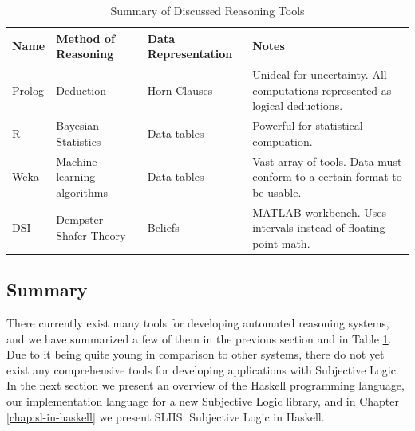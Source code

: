 \documentclass[thesis.tex]{subfiles}
\begin{document}
%
%



\begin{table}
  \begin{center}
    \begin{tabularx}{\textwidth}{| l | l | l | X |}
      \hline
      Name & Method of Reasoning & Data Representation & Notes \\
      \hline
      Prolog                & Deduction                   & Horn Clauses & Unideal for uncertainty. All computations represented as logical deductions. \\
      \hline
      R                     & Bayesian Statistics         & Data tables  & Powerful for statistical compuation.                                         \\
      \hline
      Weka                  & Machine learning algorithms & Data tables  & Vast array of tools. Data must conform to a certain format to be usable.     \\
      \hline
      DSI                   & Dempster-Shafer Theory      & Beliefs      & MATLAB workbench. Uses intervals instead of floating point math.             \\
      \hline
    \end{tabularx}
  \end{center}

  \caption{Summary of Discussed Reasoning Tools}
  \label{tbl:reasoning-tools}
\end{table}





%
%









\subsection{Summary}

There currently exist many tools for developing automated reasoning systems, and we have summarized a few
of them in the previous section and in Table \ref{tbl:reasoning-tools}.
Due to it being quite young in comparison to other systems, there do not yet exist any
comprehensive tools for developing applications with Subjective Logic. In the next section
we present an overview of the Haskell programming language, our implementation language for a new Subjective Logic
library, and in Chapter \ref{chap:sl-in-haskell} we present SLHS: Subjective Logic in Haskell.
\end{document}
